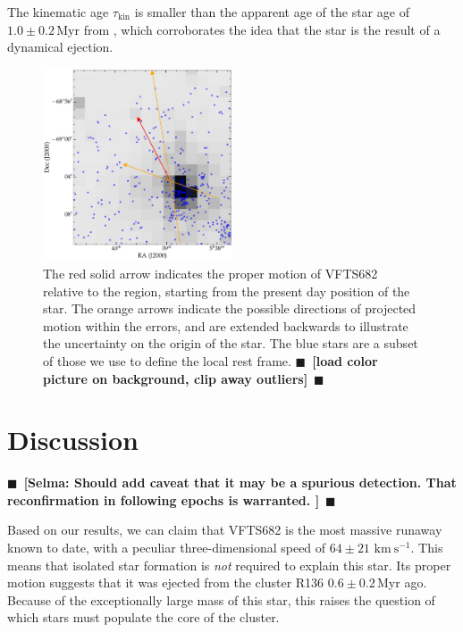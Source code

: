 \documentclass[apjl,twocolumn]{emulateapj}
\newcommand{\todo}[1]{{\large $\blacksquare$~\textbf{\color{red}[#1]}}~$\blacksquare$}
\newcommand{\kms}{{\,\mathrm{km\ s^{-1}}}}
\begin{document}
The kinematic age $\tau_\mathrm{kin}$ is smaller than the apparent age
of the star age of $1.0\pm 0.2$\,Myr from \cite{schneider:18}, which
corroborates the idea that the star is the result of a dynamical
ejection. 

\begin{figure}[htbp]
  \centering
  \includegraphics[width=0.5\textwidth]{./figures/main_plot_good}  
  \caption{The red solid arrow indicates the proper motion of VFTS682
    relative to the region, starting from the present day position of
    the star. The orange arrows indicate the possible
    directions of projected motion within the errors, and are extended
    backwards to illustrate the uncertainty on the origin of the
    star. The blue stars
    are a subset of those we use to define the local rest
    frame. \todo{load color picture on background, clip away outliers}}
  
  \label{fig:main}
\end{figure}

\section{Discussion}
\label{sec:discussion}
\todo{Selma: Should add caveat that it may be a spurious detection.  That reconfirmation in following epochs is warranted. }

Based on our results, we can claim that VFTS682 is the most massive
runaway known to date, with a peculiar three-dimensional speed of $64\pm21\,\kms$. This means that isolated star formation is
\emph{not} required to explain this star. Its proper motion suggests that it was ejected from the cluster R136
$0.6\pm0.2$\,Myr ago. Because of the exceptionally large mass
of this star, this raises the question of which stars must populate
the core of the cluster.
\end{document}
